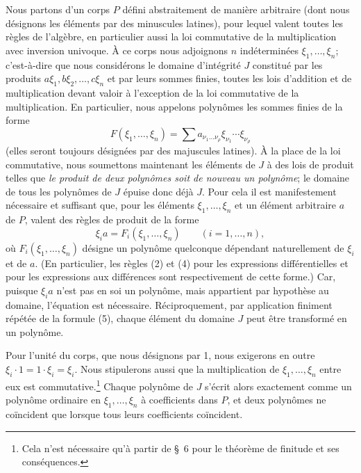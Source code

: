 Nous partons d'un corps $P$ défini abstraitement de manière arbitraire (dont nous désignons les éléments par des minuscules latines), pour lequel valent toutes les règles de l'algèbre, en particulier aussi la loi commutative de la multiplication avec inversion univoque. À ce corps nous adjoignons $n$ indéterminées $\xi_1,\ldots,\xi_n$; c'est-à-dire que nous considérons le domaine d'intégrité $J$ constitué par les produits $a\xi_1,b\xi_2,\ldots,c\xi_n$ et par leurs sommes finies, toutes les lois d'addition et de multiplication devant valoir à l'exception de la loi commutative de la multiplication. En particulier, nous appelons \og{} polynômes \fg{} les sommes finies de la forme
\[
 F(\xi_1,\ldots,\xi_n)=\sum a_{\nu_1\ldots\nu_\rho}\xi_{\nu_1}\cdots\xi_{\nu_\rho}
\]
(elles seront toujours désignées par des majuscules latines). À la place de la loi commutative, nous soumettons maintenant les éléments de $J$ à des lois de produit telles que \emph{le produit de deux polynômes soit de nouveau un polynôme}; le domaine de tous les polynômes de $J$ épuise donc déjà $J$. Pour cela il est manifestement nécessaire et suffisant que, pour les éléments $\xi_1,\ldots,\xi_n$ et un élément arbitraire $a$ de $P$, valent des règles de produit de la forme
\begin{equation}
 \xi_i a=F_i(\xi_1,\ldots,\xi_n)\qquad (i=1,\ldots,n),
\tag{5}
\end{equation}
où $F_i(\xi_1,\ldots,\xi_n)$ désigne un polynôme quelconque dépendant naturellement de $\xi_i$ et de $a$. (En particulier, les règles (2) et (4) pour les expressions différentielles et pour les expressions aux différences sont respectivement de cette forme.) Car, puisque $\xi_i a$ n'est pas en soi un polynôme, mais appartient par hypothèse au domaine, l'équation est nécessaire. Réciproquement, par application finiment répétée de la formule (5), chaque élément du domaine $J$ peut être transformé en un polynôme.

Pour l'unité du corps, que nous désignons par 1, nous exigerons en outre $\xi_i\cdot1=1\cdot\xi_i=\xi_i$. Nous stipulerons aussi que la multiplication de $\xi_1,\ldots,\xi_n$ entre eux est commutative.\footnote{Cela n'est nécessaire qu'à partir de \S~6 pour le théorème de finitude et ses conséquences.} Chaque polynôme de $J$ s'écrit alors exactement comme un polynôme ordinaire en $\xi_1,\ldots,\xi_n$ à coefficients dans $P$, et deux polynômes ne coïncident que lorsque tous leurs coefficients coïncident.

